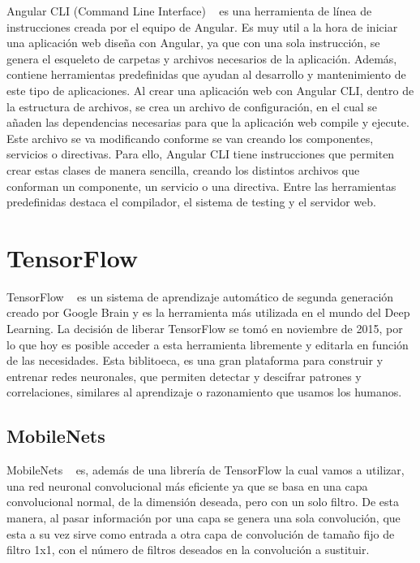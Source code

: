\documentclass[a4paper, 12pt]{book}
\begin{document}
Angular CLI (Command Line Interface) ~\cite{articulobayes} es una herramienta de línea de instrucciones creada por el equipo de Angular. Es muy util a la hora de iniciar una aplicación web diseña con Angular, ya que con una sola instrucción, se genera el esqueleto de carpetas y archivos necesarios de la aplicación. Además, contiene herramientas predefinidas que ayudan al desarrollo y mantenimiento de este tipo de aplicaciones. Al crear una aplicación web con Angular CLI, dentro de la estructura de archivos, se crea un archivo de configuración, en el cual se añaden las dependencias necesarias para que la aplicación web compile y ejecute. Este archivo se va modificando conforme se van creando los componentes, servicios o directivas. Para ello, Angular CLI tiene instrucciones que permiten crear estas clases de manera sencilla, creando los distintos archivos que conforman un componente, un servicio o una directiva. Entre las herramientas predefinidas destaca el compilador, el sistema de testing y el servidor web.

\section{TensorFlow} 
\label{sec:tensorflow}

TensorFlow ~\cite{tensorflow} es un sistema de aprendizaje automático de segunda generación creado por Google Brain y es la herramienta más utilizada en el mundo del Deep Learning. La decisión de liberar TensorFlow se tomó en noviembre de 2015, por lo que hoy es posible acceder a esta herramienta libremente y editarla en función de las necesidades. Esta biblitoeca, es una gran plataforma para construir y entrenar redes neuronales, que permiten detectar y descifrar patrones y correlaciones, similares al aprendizaje o razonamiento que usamos los humanos. 

\subsection{MobileNets} 
\label{sec:mobilenets}

MobileNets ~\cite{mobilenets} es, además de una librería de TensorFlow la cual vamos a utilizar, una red neuronal convolucional más eficiente ya que se basa en una capa convolucional normal, de la dimensión deseada, pero con un solo filtro. De esta manera, al pasar información por una capa se genera una sola convolución, que esta a su vez sirve como entrada a otra capa de convolución de tamaño fijo de filtro 1x1, con el número de filtros deseados en la convolución a sustituir.
\end{document}
